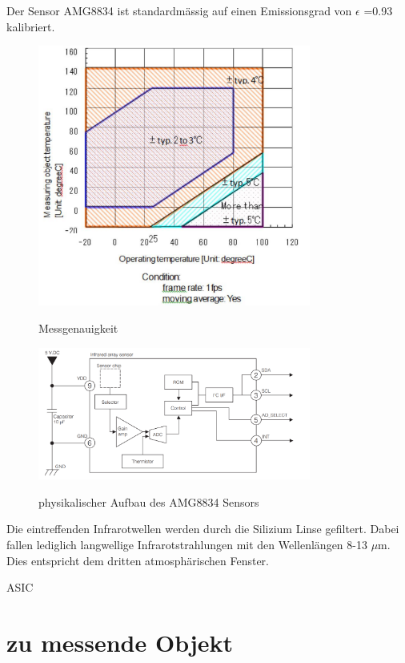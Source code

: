 Der Sensor AMG8834 ist standardmässig auf einen Emissionsgrad von $\epsilon$ =0.93 kalibriert.

\begin{figure}[H]
	\centering
	\includegraphics[width=0.8\textwidth]
	{fig/accuracy.PNG}
	\caption[Messgenauigkeit]{Messgenauigkeit} \protect\cite{AMG8834}
	\label{fig:Temperaturbereich}
\end{figure}

\begin{figure}[H]
	\centering
	\includegraphics[width=0.8\textwidth]
	{fig/Circuit_AMG8834.PNG}
	\caption[physikalischer Aufbau AMG8834 Sensors]{physikalischer Aufbau des AMG8834 Sensors} \protect\cite{AMG8834}
	\label{fig:physAufbauAMG8834}
\end{figure}

Die eintreffenden Infrarotwellen werden durch die Silizium Linse gefiltert. Dabei fallen lediglich langwellige  Infrarotstrahlungen mit den Wellenlängen 8-13 $\mu$m. Dies entspricht dem dritten atmosphärischen Fenster.


\ac{ASIC}
\section{zu messende Objekt}


